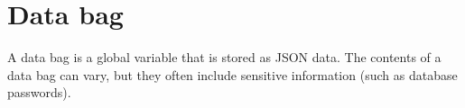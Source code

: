 \section{Data bag}

A data bag is a global variable that is stored as JSON data. The contents of a data bag can vary, but they often include sensitive information (such as database passwords).

